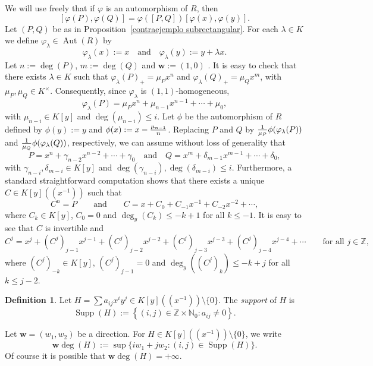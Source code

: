 \documentclass[reqno,a4paper]{amsart}
\theoremstyle{definition}
\newtheorem{definition}[theorem]{Definition}
\theoremstyle{remark}
\DeclareMathOperator{\Aut}{Aut}
\DeclareMathOperator{\Supp}{Supp}
\begin{document}
We will use freely that if $\varphi$ is an automorphism of $R$, then
$$
[\varphi(P),\varphi(Q)] = \varphi([P,Q])[\varphi(x),\varphi(y)].
$$
Let $(P,Q)$ be as in Proposition~\ref{contraejemplo subrectangular}. For each
$\lambda\in K$ we define $\varphi_{\lambda}\in\Aut(R)$ by
$$
\varphi_{\lambda}(x):=x\quad\text{and}\quad \varphi_{\lambda}(y):=y+\lambda x.
$$
Let $n:=\deg(P)$, $m:=\deg(Q)$ and  $\mathbf{w}:=(1,0)$ . It is easy to check that there
exists $\lambda\in K$ such that $\varphi_{\lambda}(P)_+ = \mu_Px^n$ and
$\varphi_{\lambda}(Q)_+ = \mu_Q x^m$, with $\mu_P,\mu_Q\in K^{\times}$. Consequently,
since $\varphi_{\lambda}$ is $(1,1)$-homogeneous,
$$
\varphi_{\lambda}(P) = \mu_P x^n + \mu_{n-1} x^{n-1} + \cdots + \mu_0,
$$
with $\mu_{n-i}\in K[y]$ and $\deg(\mu_{n-i})\le i$. Let $\phi$ be the automorphism of
$R$ defined by $\phi(y) := y$ and $\phi(x) := x - \cramped{\frac{\mu_{n-1}}{n}}$.
Replacing $P$ and $Q$ by $\cramped{\frac{1}{\mu_P} \phi(\varphi_{\lambda}(P))}$ and
$\cramped{\frac{1}{\mu_Q} \phi(\varphi_{\lambda}(Q))}$, respectively, we can assume
without loss of generality that
\begin{equation}
P = x^n + \gamma_{n-2} x^{n-2} + \cdots + \gamma_0 \quad\text{and}\quad Q =
x^m + \delta_{m-1} x^{m-1} + \cdots + \delta_0,\label{eqq1}
\end{equation}
with $\gamma_{n-i},\delta_{m-i}\in K[y]$ and $\deg(\gamma_{n-i}),\deg(\delta_{m-i})\le i$.
Furthermore, a standard straightforward computation shows that there exists a unique
$C\in K[y]((x^{-1}))$ such that
\begin{equation}
C^n = P\qquad\text{and}\qquad C = x + C_0 + C_{-1} x^{-1}+ C_{-2} x^{-2} + \cdots,\label{eqq2}
\end{equation}
where $C_k\in K[y]$, $C_0=0$ and $\deg_y(C_k)\le -k+1$ for all $k\le -1$. It is easy to
see that $C$ is invertible and
$$
C^j = x^j + (C^j)_{j-1} x^{j-1} + (C^j)_{j-2} x^{j-2} + (C^j)_{j-3} x^{j-3}
+ (C^j)_{j-4} x^{j-4} + \cdots\qquad\text{for all $j\in \mathds{Z}$,}
$$
where $(C^j)_{-k}\in K[y]$, $(C^j)_{j-1}=0$ and $\deg_y((C^j)_k)\le -k+j$ for all $k\le j-2$.

\begin{definition} Let $H = \sum a_{ij} x^i y^j \in K[y]((x^{-1}))\setminus\{0\}$. The
{\em support} of $H$ is
$$
\Supp(H):=\left\{(i,j)\in \mathds{Z}\times\mathds{N}_0 : a_{ij}\ne 0 \right\}.
$$
\end{definition}

Let $\mathbf{w}=(w_1,w_2)$ be a direction. For $H\in K[y]((x^{-1}))\setminus\{0\}$, we write
$$
\mathbf{w}\!\deg(H):=\sup\{iw_1 + jw_2 : (i,j)\in \Supp(H)\}.
$$
Of course it is possible that $\mathbf{w}\!\deg(H) = +\infty$.
\end{document}
